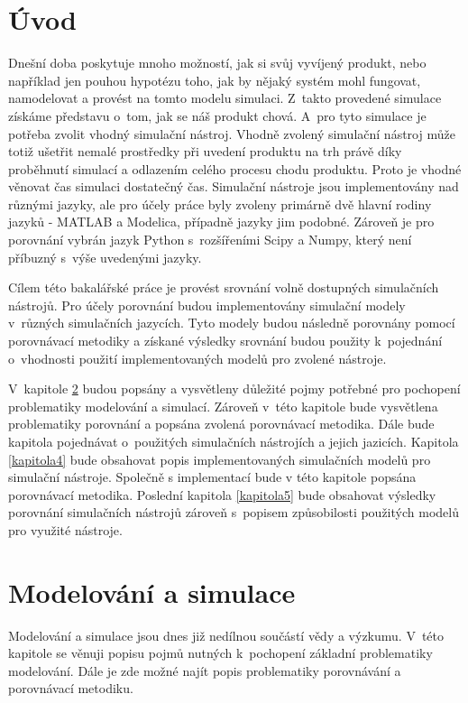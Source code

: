 \chapter{Úvod}

Dnešní doba poskytuje mnoho možností, jak si svůj vyvíjený produkt, nebo například jen pouhou hypotézu toho, jak by nějaký systém mohl fungovat, namodelovat a provést na tomto modelu simulaci. Z~takto provedené simulace získáme představu o~tom, jak se náš produkt chová. A~pro tyto simulace je potřeba zvolit vhodný simulační nástroj. Vhodně zvolený simulační nástroj může totiž ušetřit nemalé prostředky při uvedení produktu na trh právě díky proběhnutí simulací a odlazením celého procesu chodu produktu. Proto je vhodné věnovat čas simulaci dostatečný čas. Simulační nástroje jsou implementovány nad různými jazyky, ale pro účely práce byly zvoleny primárně dvě hlavní rodiny jazyků - MATLAB a Modelica, případně jazyky jim podobné. Zároveň je pro porovnání vybrán jazyk Python s~rozšířeními Scipy a Numpy, který není příbuzný s~výše uvedenými jazyky.

Cílem této bakalářské práce je provést srovnání volně dostupných simulačních nástrojů. Pro účely porovnání budou implementovány simulační modely v~různých simulačních jazycích. Tyto modely budou následně porovnány pomocí porovnávací metodiky a získané výsledky srovnání budou použity k~pojednání o~vhodnosti použití implementovaných modelů pro zvolené nástroje.

V~kapitole \ref{kapitola2} budou popsány a vysvětleny důležité pojmy potřebné pro pochopení problematiky modelování a simulací. Zároveň v~této kapitole bude vysvětlena problematiky porovnání a popsána zvolená porovnávací metodika. Dále bude kapitola pojednávat o~použitých simulačních nástrojích a jejich jazicích. Kapitola \ref{kapitola4} bude obsahovat popis implementovaných simulačních modelů pro simulační nástroje. Společně s implementací bude v této kapitole popsána porovnávací metodika. Poslední kapitola \ref{kapitola5} bude obsahovat výsledky porovnání simulačních nástrojů zároveň s~popisem způsobilosti použitých modelů pro využité nástroje.

\chapter{Modelování a simulace}
\label{kapitola2}

Modelování a simulace jsou dnes již nedílnou součástí vědy a výzkumu. V~této kapitole se věnuji popisu pojmů nutných k~pochopení základní problematiky modelování. Dále je zde možné najít popis problematiky porovnávání a porovnávací metodiku.

